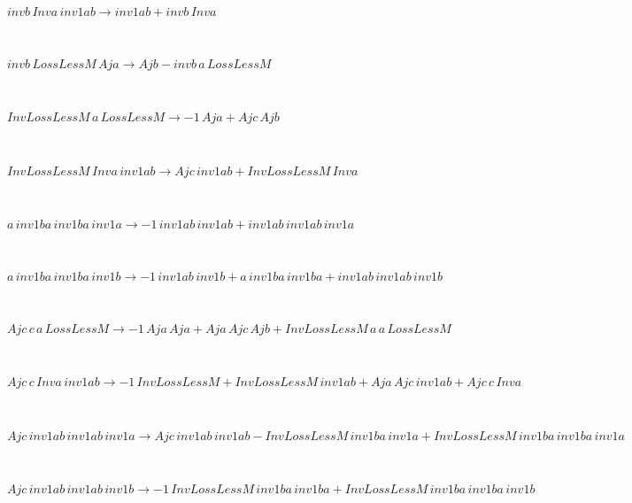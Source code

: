 \begin{minipage}{6in}
$
invb\,
 Inva\,
 inv1ab\rightarrow inv1ab + invb\,
 Inva
$
\end{minipage}\medskip \\
\begin{minipage}{6in}
$
invb\,
 LossLessM\,
 Aja\rightarrow Ajb - invb\,
 a\,
 LossLessM
$
\end{minipage}\medskip \\
\begin{minipage}{6in}
$
InvLossLessM\,
 a\,
 LossLessM\rightarrow -1\,
 Aja + Ajc\,
 Ajb
$
\end{minipage}\medskip \\
\begin{minipage}{6in}
$
InvLossLessM\,
 Inva\,
 inv1ab\rightarrow Ajc\,
 inv1ab + InvLossLessM\,
 Inva
$
\end{minipage}\medskip \\
\begin{minipage}{6in}
$
a\,
 inv1ba\,
 inv1ba\,
 inv1a\rightarrow -1\,
 inv1ab\,
 inv1ab + inv1ab\,
 inv1ab\,
 inv1a
$
\end{minipage}\medskip \\
\begin{minipage}{6in}
$
a\,
 inv1ba\,
 inv1ba\,
 inv1b\rightarrow -1\,
 inv1ab\,
 inv1b + a\,
 inv1ba\,
 inv1ba + inv1ab\,
 inv1ab\,
 inv1b
$
\end{minipage}\medskip \\
\begin{minipage}{6in}
$
Ajc\,
 c\,
 a\,
 LossLessM\rightarrow -1\,
 Aja\,
 Aja + Aja\,
 Ajc\,
 Ajb + InvLossLessM\,
 a\,
 a\,
 LossLessM
$
\end{minipage}\medskip \\
\begin{minipage}{6in}
$
Ajc\,
 c\,
 Inva\,
 inv1ab\rightarrow -1\,
 InvLossLessM + InvLossLessM\,
 inv1ab + Aja\,
 Ajc\,
 inv1ab + Ajc\,
 c\,
 Inva
$
\end{minipage}\medskip \\
\begin{minipage}{6in}
$
Ajc\,
 inv1ab\,
 inv1ab\,
 inv1a\rightarrow Ajc\,
 inv1ab\,
 inv1ab - InvLossLessM\,
 inv1ba\,
 inv1a + InvLossLessM\,
 inv1ba\,
 inv1ba\,
 inv1a
$
\end{minipage}\medskip \\
\begin{minipage}{6in}
$
Ajc\,
 inv1ab\,
 inv1ab\,
 inv1b\rightarrow -1\,
 InvLossLessM\,
 inv1ba\,
 inv1ba + InvLossLessM\,
 inv1ba\,
 inv1ba\,
 inv1b
$
\end{minipage}\medskip \\
